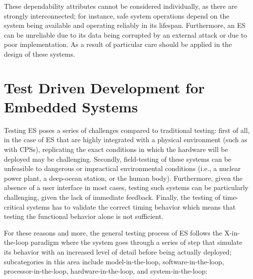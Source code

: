 These dependability attributes cannot be considered individually, as there are strongly interconnected; for instance, safe system operations depend on the system being available and operating reliably in its lifespan. Furthermore, an ES can be unreliable due to its data being corrupted by an external attack or due to poor implementation. As a result of particular care should be applied in the design of these systems. 





\section{Test Driven Development for Embedded Systems}
Testing ES poses a series of challenges compared to traditional testing: first of all, in the case of ES that are highly integrated with a physical environment (such as with CPSs), replicating the exact conditions in which the hardware will be deployed may be challenging. Secondly, field-testing of these systems can be unfeasible to dangerous or impractical environmental conditions (i.e., a nuclear power plant, a deep-ocean station, or the human body). Furthermore, given the absence of a user interface in most cases, testing such systems can be particularly challenging, given the lack of immediate feedback. Finally, the testing of time-critical systems has to validate the correct timing behavior which means that testing the functional behavior alone is not sufficient.


For these reasons and more, the general testing process of ES follows the X-in-the-loop paradigm \cite{DBLP:journals/software/GarousiFKY18} where the system goes through a series of step that simulate its behavior with an increased level of detail before being actually deployed; subcategories in this area include model-in-the-loop, software-in-the-loop, processor-in-the-loop, hardware-in-the-loop, and system-in-the-loop:


